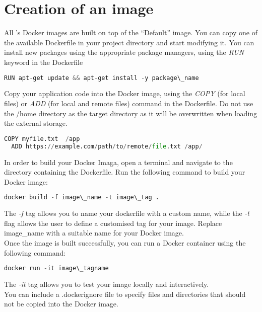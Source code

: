 \section{Creation of an image}\label{image_creation}
All \uninuvola's Docker images are built on top of the ``Default'' image. You can copy one of the available  Dockerfile in your project directory and start modifying it. You can install new packages using the appropriate package managers, using the \textit{RUN} keyword in the Dockerfile

\begin{lstlisting}[language=python]
  RUN apt-get update && apt-get install -y package\_name
\end{lstlisting}

Copy your application code into the Docker image, using the \textit{COPY} (for local files) or \textit{ADD} (for local and remote files) command in the Dockerfile. Do not use the /home directory as the target directory as it will be overwritten when loading the external storage.

\begin{lstlisting}[language=python]
  COPY myfile.txt  /app
  ADD https://example.com/path/to/remote/file.txt /app/
\end{lstlisting}

In order to build your Docker Imaga, open a terminal and navigate to the directory containing the Dockerfile. Run the following command to build your Docker image:

\begin{lstlisting}[language=python]
    docker build -f image\_name -t image\_tag .
\end{lstlisting}

The \textit{-f} tag allows you to name your dockerfile with a custom name, while the \textit{-t}  flag allows the user to define a customised tag for your image. Replace image\_name with a suitable name for your Docker image. \\

Once the image is built successfully, you can run a Docker container using the following command:

\begin{lstlisting}[language=python]
    docker run -it image\_tagname 
\end{lstlisting}
    
The \textit{-it} tag allows you to test your image locally and interactively. \\

You can include a .dockerignore file to specify files and directories that should not be copied into the Docker image. 